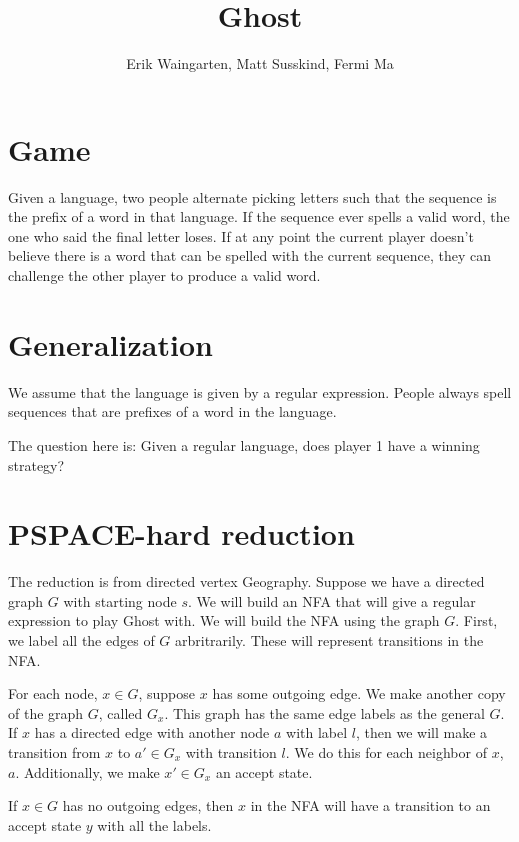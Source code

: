 \documentclass[11pt]{article}
\author{Erik Waingarten, Matt Susskind, Fermi Ma}
\title{Ghost}
\begin{document}
         
\maketitle

\section{Game}

Given a language, two people alternate picking letters such that the sequence is the prefix of a word in that language. If the sequence ever spells a valid word, the one who said the final letter loses. If at any point the current player doesn't believe there is a word that can be spelled with the current sequence, they can challenge the other player to produce a valid word.

\section{Generalization}

We assume that the language is given by a regular expression. People always spell sequences that are prefixes of a word in the language.

The question here is: Given a regular language, does player 1 have a winning strategy?

\section{PSPACE-hard reduction}

The reduction is from directed vertex Geography. Suppose we have a directed graph $G$ with starting node $s$. We will build an NFA that will give a regular expression to play Ghost with. We will build the NFA using the graph $G$. First, we label all the edges of $G$ arbritrarily. These will represent transitions in the NFA. 

For each node, $x \in G$, suppose $x$ has some outgoing edge. We make another copy of the graph $G$, called $G_x$. This graph has the same edge labels as the general $G$. If $x$ has a directed edge with another node $a$ with label $l$, then we will make a transition from $x$ to $a' \in G_x$ with transition $l$. We do this for each neighbor of $x$, $a$. Additionally, we make $x' \in G_x$ an accept state. 

If $x \in G$ has no outgoing edges, then $x$ in the NFA will have a transition to an accept state $y$ with all the labels.
\end{document}

